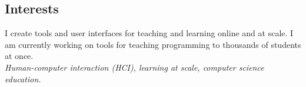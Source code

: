 \documentclass[margin]{res}
\begin{document}
 

 
\address{32 Vassar Street, Rm 32-G715\\Cambridge, MA 02139}
\address{ELG@MIT.edu\\
(215) 694-9631} 

 
\begin{resume} 
 
\section{Interests} 
I create tools and user interfaces for teaching and learning online and at scale. I am currently working on tools for teaching programming to thousands of students at once.\\
{\it Human-computer interaction (HCI), learning at scale, computer science education.}






\end{resume}
\end{document}
